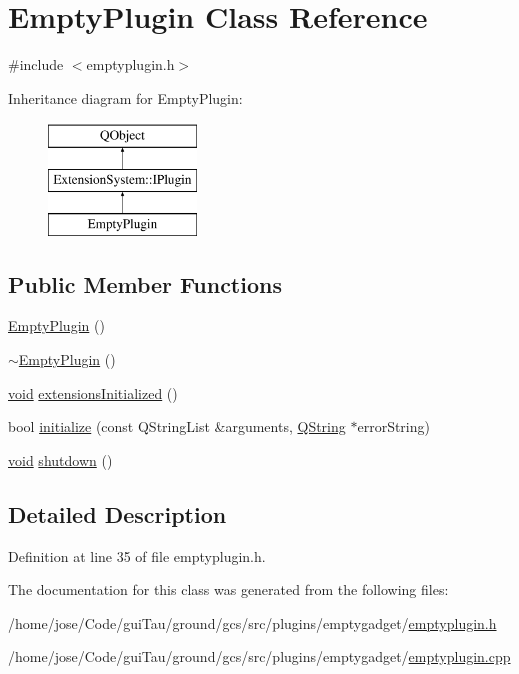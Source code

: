 \hypertarget{class_empty_plugin}{\section{Empty\-Plugin Class Reference}
\label{class_empty_plugin}
}


{\ttfamily \#include $<$emptyplugin.\-h$>$}

Inheritance diagram for Empty\-Plugin\-:\begin{figure}[H]
\begin{center}
\leavevmode
\includegraphics[height=3.000000cm]{class_empty_plugin}
\end{center}
\end{figure}
\subsection*{Public Member Functions}
\begin{DoxyCompactItemize}
\item 
\hyperlink{group___empty_gadget_plugin_ga18898df1886d72c9e78700927c8f57c6}{Empty\-Plugin} ()
\item 
\hyperlink{group___empty_gadget_plugin_ga0b4688809806874293c66af38d98f1ec}{$\sim$\-Empty\-Plugin} ()
\item 
\hyperlink{group___u_a_v_objects_plugin_ga444cf2ff3f0ecbe028adce838d373f5c}{void} \hyperlink{group___empty_gadget_plugin_ga492a22cdbf38d6fbb6b42e959e880d86}{extensions\-Initialized} ()
\item 
bool \hyperlink{group___empty_gadget_plugin_gafe72f3b00f1dfd2dc2acf021ab2e77b2}{initialize} (const Q\-String\-List \&arguments, \hyperlink{group___u_a_v_objects_plugin_gab9d252f49c333c94a72f97ce3105a32d}{Q\-String} $\ast$error\-String)
\item 
\hyperlink{group___u_a_v_objects_plugin_ga444cf2ff3f0ecbe028adce838d373f5c}{void} \hyperlink{group___empty_gadget_plugin_ga01fcca3c81851cf81fdb21b97632ea0a}{shutdown} ()
\end{DoxyCompactItemize}


\subsection{Detailed Description}


Definition at line 35 of file emptyplugin.\-h.



The documentation for this class was generated from the following files\-:\begin{DoxyCompactItemize}
\item 
/home/jose/\-Code/gui\-Tau/ground/gcs/src/plugins/emptygadget/\hyperlink{emptyplugin_8h}{emptyplugin.\-h}\item 
/home/jose/\-Code/gui\-Tau/ground/gcs/src/plugins/emptygadget/\hyperlink{emptyplugin_8cpp}{emptyplugin.\-cpp}\end{DoxyCompactItemize}
